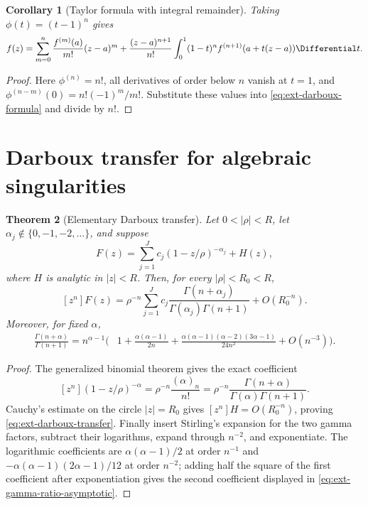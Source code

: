 \documentclass[11pt,a4paper,oneside,openany]{book}
\newtheorem{theorem}{Theorem}[chapter]
\newtheorem{corollary}[theorem]{Corollary}
\theoremstyle{definition}
\theoremstyle{remark}
\begin{document}
\begin{corollary}[Taylor formula with integral remainder]
Taking \(\phi(t)=(t-1)^n\) gives
\begin{equation}\label{eq:ext-taylor-integral-remainder}
 f(z)=\sum_{m=0}^n\frac{f^{(m)}(a)}{m!}(z-a)^m
 +\frac{(z-a)^{n+1}}{n!}\int_0^1(1-t)^n
 f^{(n+1)}(a+t(z-a))\Differential t.
\end{equation}
\end{corollary}
\begin{proof}
Here \(\phi^{(n)}=n!\), all derivatives of order below \(n\) vanish at
\(t=1\), and
\(\phi^{(n-m)}(0)=n!(-1)^m/m!\).  Substitute these values into
\eqref{eq:ext-darboux-formula} and divide by \(n!\).
\end{proof}

\section{Darboux transfer for algebraic singularities}

\begin{theorem}[Elementary Darboux transfer]
\label{thm:ext-darboux-transfer}
Let \(0<|\rho|<R\), let
\(\alpha_j\notin\{0,-1,-2,\ldots\}\), and suppose
\begin{equation}\label{eq:ext-darboux-decomposition}
 F(z)=\sum_{j=1}^Jc_j(1-z/\rho)^{-\alpha_j}+H(z),
\end{equation}
where \(H\) is analytic in \(|z|<R\).  Then, for every
\(|\rho|<R_0<R\),
\begin{equation}\label{eq:ext-darboux-transfer}
 [z^n]F(z)=\rho^{-n}\sum_{j=1}^Jc_j
 \frac{\Gamma(n+\alpha_j)}{\Gamma(\alpha_j)\Gamma(n+1)}
 +O(R_0^{-n}).
\end{equation}
Moreover, for fixed \(\alpha\),
\begin{align}
 \frac{\Gamma(n+\alpha)}{\Gamma(n+1)}
 =n^{\alpha-1}\biggl(&1+\frac{\alpha(\alpha-1)}{2n}
 +\frac{\alpha(\alpha-1)(\alpha-2)(3\alpha-1)}{24n^2}
 +O(n^{-3})\biggr).
 \label{eq:ext-gamma-ratio-asymptotic}
\end{align}
\end{theorem}
\begin{proof}
The generalized binomial theorem gives the exact coefficient
\[
 [z^n](1-z/\rho)^{-\alpha}
 =\rho^{-n}\frac{(\alpha)_n}{n!}
 =\rho^{-n}\frac{\Gamma(n+\alpha)}{\Gamma(\alpha)\Gamma(n+1)}.
\]
Cauchy's estimate on the circle \(|z|=R_0\) gives
\([z^n]H=O(R_0^{-n})\), proving
\eqref{eq:ext-darboux-transfer}.  Finally insert Stirling's expansion for the
two gamma factors, subtract their logarithms, expand through \(n^{-2}\), and
exponentiate.  The logarithmic coefficients are
\(\alpha(\alpha-1)/2\) at order \(n^{-1}\) and
\(-\alpha(\alpha-1)(2\alpha-1)/12\) at order \(n^{-2}\); adding half the
square of the first coefficient after exponentiation gives the second
coefficient displayed in \eqref{eq:ext-gamma-ratio-asymptotic}.
\end{proof}
\end{document}
